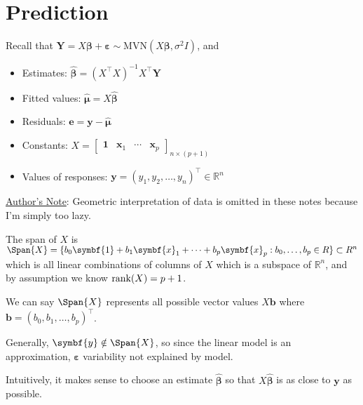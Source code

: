 \section{Prediction}
Recall that $ \symbf{Y}=X\symbf{\beta}+\symbf{\varepsilon}
    \sim \text{MVN}(X\symbf{\beta},\sigma^2 I) $, and
\begin{itemize}
    \item Estimates: $ \hat{\symbf{\beta}}=(X^\top X)^{-1}X^\top \symbf{Y} $
    \item Fitted values: $ \hat{\symbf{\mu}}=X\hat{\symbf{\beta}} $
    \item Residuals: $ \symbf{e}=\symbf{y}-\hat{\symbf{\mu}} $
    \item Constants: $ X=\begin{bmatrix}
                  \symbf{1} & \symbf{x}_1 & \cdots & \symbf{x}_p
              \end{bmatrix}_{n\times(p+1)} $
    \item Values of responses: $
              \symbf{y}=(y_1,y_2,\ldots,y_n)^\top \in\mathbb{R}^n $
\end{itemize}
\underline{Author's Note}: Geometric interpretation of data is omitted in these notes because
I'm simply too lazy.

The span of $ X $ is $ \Span{X}=
    \set{b_0\symbf{1}+b_1\symbf{x}_1+\cdots+b_p\symbf{x}_p:b_0,\ldots,b_p\in\mathbb{R}}
    \subset \mathbb{R}^n $
which is all linear combinations of columns of $ X $ which is a subspace
of $ \mathbb{R}^n $, and by assumption we know $ \operatorname{rank}(X)=p+1 $.

We can say $ \Span{X} $ represents all possible vector
values $ X\symbf{b} $ where $ \symbf{b}=(b_0,b_1,\ldots,b_p)^\top $.

Generally, $ \symbf{y}\notin\Span{X} $, so since
the linear model is an approximation, $ \symbf{\varepsilon} $
variability not explained by model.

Intuitively, it makes sense to choose an estimate
$ \hat{\symbf{\beta}} $ so that $ X\hat{\symbf{\beta}} $
is as close to $ \symbf{y} $ as possible.

